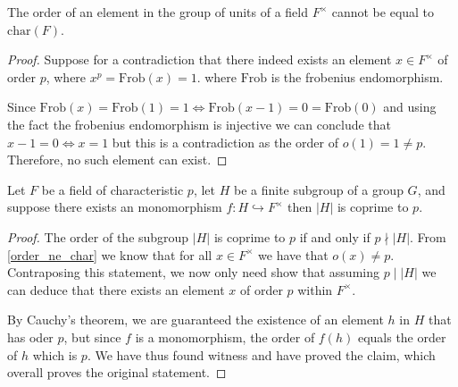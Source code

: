 \begin{lemma}
  \label{order_ne_char}
  \leanok
  The order of an element in the group of units of a field $F^\times$ cannot be equal to $\textrm{char}(F)$.
\end{lemma}
\begin{proof}
\leanok
Suppose for a contradiction that there indeed exists an element $x \in F^\times$ of order $p$, where $x^p = \textrm{Frob}(x) = 1$. where $\textrm{Frob}$
is the frobenius endomorphism.

Since $\textrm{Frob}(x) = \textrm{Frob}(1) = 1 \iff \textrm{Frob}(x - 1) = 0 = \textrm{Frob}(0)$ and using the fact the frobenius endomorphism is injective
we can conclude that $x - 1 = 0 \iff x = 1$ but this is a contradiction as the order of $o(1) = 1 \ne p$. Therefore, no such element can exist.
\end{proof}


\begin{lemma}
  \label{coprime_card_fin_subgroup_of_inj_hom_group_iso_units}
  \leanok
  Let $F$ be a field of characteristic $p$, let $H$ be a finite subgroup of a group $G$, and suppose there exists an monomorphism $f : H \hookrightarrow F^\times$
  then $|H|$ is coprime to $p$.
\end{lemma}
\begin{proof}
\leanok
The order of the subgroup $|H|$ is coprime to $p$ if and only if $p \nmid |H|$. From \ref{order_ne_char} we know that
for all $x \in F^\times$ we have that $o(x) \ne p$. Contraposing this statement, we now only need show that assuming $p \mid |H|$ we can deduce that
there exists an element $x$ of order $p$ within $F^\times$.

By Cauchy's theorem, we are guaranteed the existence of an element $h$ in $H$ that has oder $p$, but since $f$ is a monomorphism, the order of $f(h)$ equals the order of $h$ which is $p$.
We have thus found witness and have proved the claim, which overall proves the original statement.
\end{proof}



